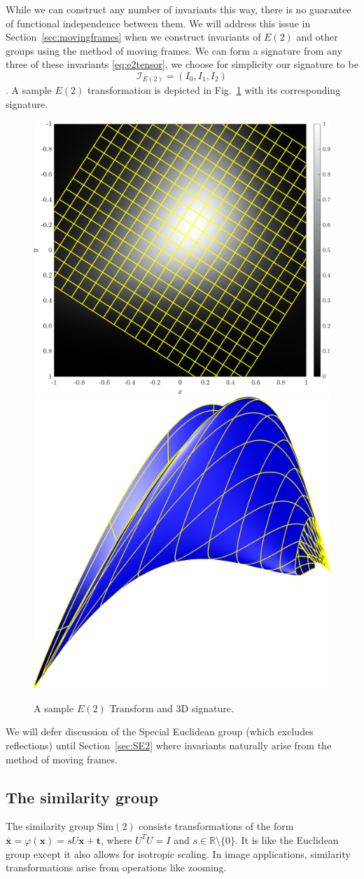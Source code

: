 \documentclass[review,onefignum,onetabnum]{siamonline190516}
\begin{document}
While we can construct any number of invariants this way, there is no
guarantee of functional independence between them. We will address this
issue in Section~\ref{sec:movingframes} when we construct invariants of
$E(2)$ and other groups using the method of moving frames. We can form a
signature from any three of these invariants \eqref{eq:e2tensor}, we choose for
simplicity our signature to be 
\begin{equation}
    \label{eq:e2signature}
    \mathcal{I}_{E(2)} = (I_0, I_1, I_2)
\end{equation}.  
A sample $E(2)$ transformation is depicted in Fig.~\ref{fig:E2} with its corresponding
signature.
\begin{figure}
\centering
\includegraphics[width=.45\textwidth]{Figs/f_transformed_E2.png}
\includegraphics[width=.45\textwidth]{Figs/E2_signature.png}
\caption{A sample $E(2)$ Transform and 3D signature.}
\label{fig:E2}
\end{figure}
We will defer discussion of the Special Euclidean group (which excludes
reflections) until Section~\ref{sec:SE2} where invariants naturally arise
from the method of moving frames.

\subsection{The similarity group}
\label{sec:Sim2}
The similarity group $\text{Sim}(2)$ consists transformations of the form
$\bar{\mathbf{x}} = \varphi(\mathbf{x}) = sU\mathbf{x} + \mathbf{t}$, where $U^TU = I$ and $s
\in \mathbb{R}\setminus\{0\}$. It is like the Euclidean group except it
also allows for isotropic scaling. In image applications, similarity
transformations arise from operations like zooming.
\end{document}
